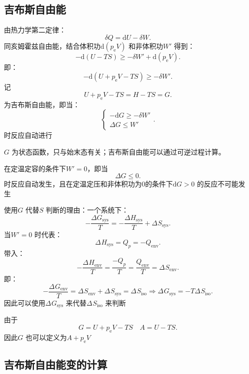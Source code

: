 \subsection{吉布斯自由能}%
\label{sub:吉布斯自由能}
\begin{defi}
    由热力学第二定律：\[
        \delta Q = \mathrm{d}U -\delta W
    .\]
    同亥姆霍兹自由能，结合体积功$\mathrm{d}\left( p_\text{e}V \right)$ 和非体积功$W'$ 得到：\[
        -\mathrm{d}\left( U-TS \right) \ge -\delta W' + \mathrm{d}\left( p_\text{e}V \right)
    .\]
    即：
    \[
        -\mathrm{d}\left( U+p_\text{e}V-TS \right) \ge -\delta W'
    .\]
    记\[\boxed{
        U+p_\text{e}V-TS=H-TS=G
    .}\]
    为吉布斯自由能，即当：\[
        \begin{cases}
            -\mathrm{d}G \ge -\delta W'\\
            \Delta G \le W'
        \end{cases}
    .\]
    时反应自动进行
\end{defi}
$G$ 为状态函数，只与始末态有关；吉布斯自由能可以通过可逆过程计算。
\begin{notation}
    在定温定容的条件下$W'=0$，即当
    \[\boxed{
        \Delta G \le 0
    .}\]
    时反应自动发生，且在定温定压和非体积功为0的条件下$\mathrm{d}G>0$ 的反应不可能发生
\end{notation}
使用$G$ 代替$S$ 判断的理由：一个系统下：\[
    -\frac{\Delta G_\text{sys}}{T} = -\frac{\Delta H_\text{sys}}{T}+\Delta_\text{}S_{\text{sys}} 
.\]
当$W'=0$ 时代表：\[
    \Delta_\text{}H_{\text{sys}} = Q_{p} = -Q_\text{env} 
.\]
带入：\[
    -\frac{\Delta_\text{}H_{\text{env}} }{T} = \frac{-Q_{p}}{T} = \frac{Q_\text{env}}{T} = \Delta_\text{}S_\text{env} 
.\]
即：\[
    -\frac{\Delta_\text{}G_{\text{env}} }{T} = \Delta_\text{}S_{\text{env}} + \Delta_\text{}S_{\text{sys}} = \Delta_\text{}S_{\text{iso}} \Rightarrow \Delta_\text{}G_{\text{sys}} = -T\Delta_\text{}S_\text{iso}
.\]
因此可以使用$\Delta_\text{}G_\text{sys} $ 来代替$\Delta_\text{}S_{\text{iso}} $ 来判断
\begin{notation}
    由于\[
        G = U + p_\text{e}V -TS\quad A = U-TS
    .\]
    因此$G$ 也可以定义为$A+p_\text{e}V$
\end{notation}
\subsection{吉布斯自由能变的计算}%
\label{sub:吉布斯自由能变的计算}

